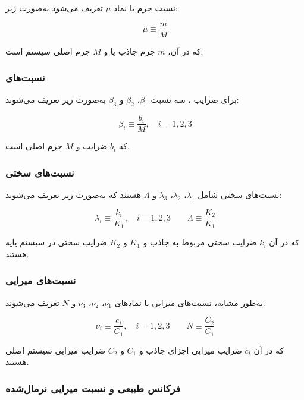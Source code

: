 نسبت جرم با نماد $\mu$ تعریف می‌شود به‌صورت زیر:

\begin{equation}
\mu \equiv \frac{m}{M}
\end{equation}

که در آن، $m$ جرم جاذب یا  و $M$ جرم اصلی سیستم است.

\subsubsection*{نسبت‌های }

برای ضرایب ، سه نسبت $\beta_1$، $\beta_2$ و $\beta_3$ به‌صورت زیر تعریف می‌شوند:

\begin{equation}
\beta_i \equiv \frac{b_i}{M}, \quad i=1,2,3
\end{equation}

که $b_i$ ضرایب  و $M$ جرم اصلی است.

\subsubsection*{نسبت‌های سختی}

نسبت‌های سختی شامل $\lambda_1$، $\lambda_2$، $\lambda_3$ و $\Lambda$ هستند که به‌صورت زیر تعریف می‌شوند:

\begin{equation}
\lambda_i \equiv \frac{k_i}{K_1}, \quad i=1,2,3 \qquad \Lambda \equiv \frac{K_2}{K_1}
\end{equation}

که در آن $k_i$ ضرایب سختی مربوط به جاذب و $K_1$ و $K_2$ ضرایب سختی در سیستم پایه هستند.

\subsubsection*{نسبت‌های میرایی}

به‌طور مشابه، نسبت‌های میرایی با نمادهای $\nu_1$، $\nu_2$، $\nu_3$ و $N$ تعریف می‌شوند:

\begin{equation}
\nu_i \equiv \frac{c_i}{C_1}, \quad i=1,2,3 \qquad N \equiv \frac{C_2}{C_1}
\end{equation}

که در آن $c_i$ ضرایب میرایی اجزای جاذب و $C_1$ و $C_2$ ضرایب میرایی سیستم اصلی هستند.

\subsubsection*{فرکانس طبیعی و نسبت میرایی نرمال‌شده}

